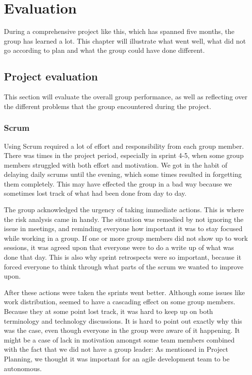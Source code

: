 \section{Evaluation}
\label{evaluation}
During a comprehensive project like this, which has spanned five months, the group has learned a lot. This chapter will illustrate what went well, what did not go according to plan and what the group could have done different.

\subsection{Project evaluation}

This section will evaluate the overall group performance, as well as reflecting over the different problems that the group encountered during the project.

\subsubsection{Scrum}
\label{scrum_eval}
Using Scrum required a lot of effort and responsibility from each group member. There was times in the project period, especially in sprint 4-5, when some group members struggled with both effort and motivation. We got in the habit of delaying daily scrums until the evening, which some times resulted in forgetting them completely. This may have effected the group in a bad way because we sometimes lost track of what had been done from day to day.

The group acknowledged the urgency of taking immediate actions. This is where the risk analysis came in handy. The situation was remedied by not ignoring the issue in meetings, and reminding everyone how important it was to stay focused while working in a group. If one or more group members did not show up to work sessions, it was agreed upon that everyone were to do a write up of what was done that day. This is also why sprint retrospects were so important, because it forced everyone to think through what parts of the scrum we wanted to improve upon. 

After these actions were taken the sprints went better. Although some issues like work distribution, seemed to have a cascading effect on some group members. Because they at some point lost track, it was hard to keep up on both terminology and technology discussions. It is hard to point out exactly why this was the case, even though everyone in the group were aware of it happening. It might be a case of lack in motivation amongst some team members combined with the fact that we did not have a group leader: As mentioned in Project Planning, we thought it was important for an agile development team to be autonomous.

